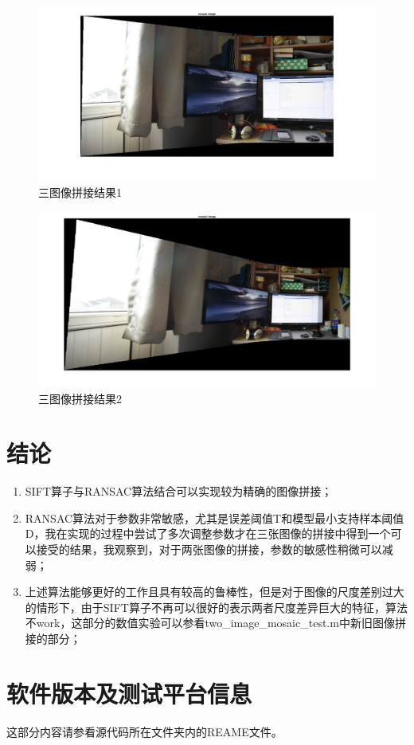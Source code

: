 \documentclass[a4paper, UTF8]{ctexrep}
\begin{document}
		\begin{figure}[htbp!]
			\centering
			\includegraphics[width = \textwidth]{hw2_fig6.png}
			\caption{三图像拼接结果1}
			\label{fig:figure1}
		\end{figure}
		\clearpage
		\begin{figure}[htbp!]
			\centering
			\includegraphics[width = \textwidth]{hw2_fig7.png}
			\caption{三图像拼接结果2}
			\label{fig:figure1}
		\end{figure}
		
	\section{结论}
	\begin{enumerate}
		\item SIFT算子与RANSAC算法结合可以实现较为精确的图像拼接；
		\item RANSAC算法对于参数非常敏感，尤其是误差阈值T和模型最小支持样本阈值D，我在实现的过程中尝试了多次调整参数才在三张图像的拼接中得到一个可以接受的结果，我观察到，对于两张图像的拼接，参数的敏感性稍微可以减弱；
		\item 上述算法能够更好的工作且具有较高的鲁棒性，但是对于图像的尺度差别过大的情形下，由于SIFT算子不再可以很好的表示两者尺度差异巨大的特征，算法不work，这部分的数值实验可以参看two\_image\_mosaic\_test.m中新旧图像拼接的部分；
	\end{enumerate}

  \section{软件版本及测试平台信息}
    这部分内容请参看源代码所在文件夹内的REAME文件。
\end{document}

